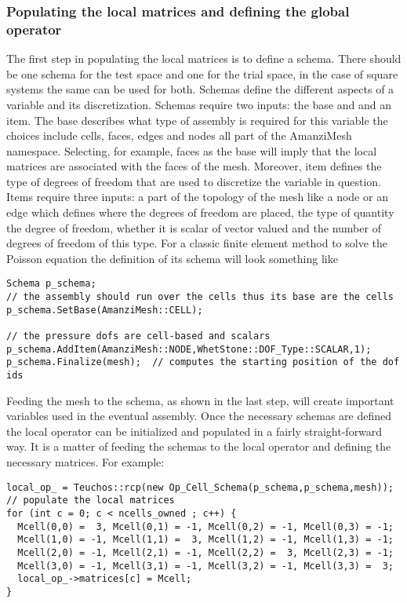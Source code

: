 \subsubsection{Populating the local matrices and defining the global operator}\label{Sec:LocalMatAndGlobalOp}
%
The first step in populating the local matrices is to define a schema.
% 
There should be one schema for the test space and one for the trial space, in the case of square systems the same can be used for both.
% 
Schemas define the different aspects of a variable and its discretization.
%
Schemas require two inputs: the base and and an item.
%
The base describes what type of assembly is required for this variable the choices include cells, faces, edges and nodes all part of the AmanziMesh namespace.
%
Selecting, for example, faces as the base will imply that the local matrices are associated with the faces of the mesh.
%
Moreover, item defines the type of degrees of freedom that are used to discretize the variable in question.
%
Items require three inputs: a part of the topology of the mesh like a node or an edge which defines where the degrees of freedom are placed, the type of quantity the degree of freedom, whether it is scalar of vector valued and the number of degrees of freedom of this type.
%
For a classic finite element method to solve the Poisson equation the definition of its schema will look something like
%
\begin{lstlisting}
Schema p_schema;
// the assembly should run over the cells thus its base are the cells
p_schema.SetBase(AmanziMesh::CELL);

// the pressure dofs are cell-based and scalars
p_schema.AddItem(AmanziMesh::NODE,WhetStone::DOF_Type::SCALAR,1);
p_schema.Finalize(mesh);  // computes the starting position of the dof ids
\end{lstlisting}
%
Feeding the mesh to the schema, as shown in the last step, will create important variables used in the eventual assembly.
%
Once the necessary schemas are defined the local operator can be initialized and populated in a fairly straight-forward way.
% 
It is a matter of feeding the schemas to the local operator and defining the necessary matrices. For example:
%
\begin{lstlisting}
local_op_ = Teuchos::rcp(new Op_Cell_Schema(p_schema,p_schema,mesh));
// populate the local matrices
for (int c = 0; c < ncells_owned ; c++) {
  Mcell(0,0) =  3, Mcell(0,1) = -1, Mcell(0,2) = -1, Mcell(0,3) = -1;
  Mcell(1,0) = -1, Mcell(1,1) =  3, Mcell(1,2) = -1, Mcell(1,3) = -1;
  Mcell(2,0) = -1, Mcell(2,1) = -1, Mcell(2,2) =  3, Mcell(2,3) = -1;
  Mcell(3,0) = -1, Mcell(3,1) = -1, Mcell(3,2) = -1, Mcell(3,3) =  3;
  local_op_->matrices[c] = Mcell;
}
\end{lstlisting}
